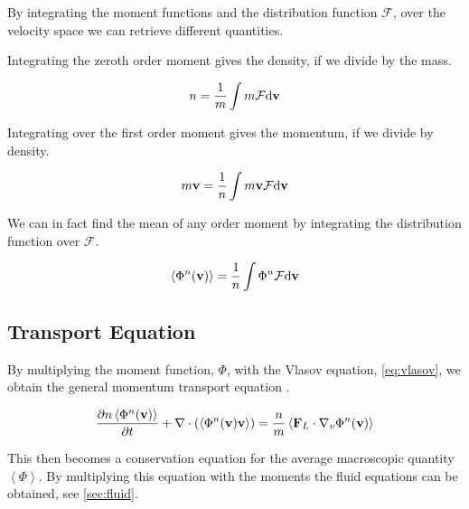 	By integrating the moment functions and the distribution function
	\(\mathcal{F}\), over the velocity space we can retrieve different quantities.

	Integrating the zeroth order moment gives the density, if we divide by the
	mass.

	\begin{equation}
			n = \frac{1}{m}\int m \mathcal{F} \dd\vb{v}
	\end{equation}

	Integrating over the first order moment gives the momentum, if we divide
	by density.

	\begin{equation}
			m\vb{v} =\frac{1}{n} \int m \vb{v} \mathcal{F} \dd\vb{v}
	\end{equation}

	We can in fact find the mean of any order moment by integrating the
	distribution function over \(\mathcal{F}\).

	\begin{equation}
		\left< \Phi^n(\vb{v}) \right> = \frac{1}{n} \int \Phi^n \mathcal{F} \dd\vb{v}
	\end{equation}

\subsection{Transport Equation}
	By multiplying the moment function, \( \Phi \), with the Vlasov equation, \cref{eq:vlasov},
	we obtain the general momentum transport equation \citep{shu_physics_2010}.

	\begin{equation}
		\pdv{n\left< \Phi^n(\vb{v}) \right>}{t} + \nabla \cdot \left( \left< \Phi^n(\vb{v})\vb{v} \right> \right)
		= \frac{n}{m} \left< \vb{F}_L \cdot \nabla_v \Phi^n(\vb{v}) \right>
	\end{equation}

	This then becomes a conservation equation for the average macroscopic quantity
	\(\left< \Phi \right>\). By multiplying this equation with the moments the fluid
	equations can be obtained, see \cref{sec:fluid}.






